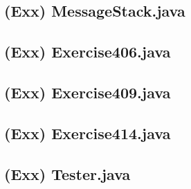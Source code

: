 \documentclass[main.tex]{subfiles}
\begin{document}
\newpage
\subsection*{(Exx) MessageStack.java}


\newpage
\subsection*{(Exx) Exercise406.java}


\newpage
\subsection*{(Exx) Exercise409.java}


\newpage
\subsection*{(Exx) Exercise414.java}


\newpage
\subsection*{(Exx) Tester.java}

\end{document}
